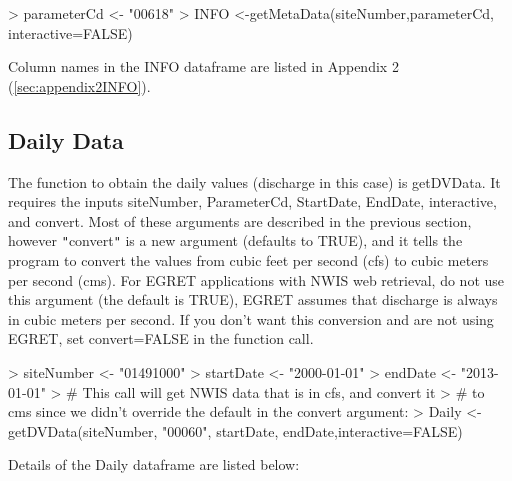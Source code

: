 \documentclass[a4paper,11pt]{article}
\begin{document}
\begin{Schunk}
\begin{Sinput}
> parameterCd <- "00618"
> INFO <-getMetaData(siteNumber,parameterCd, interactive=FALSE)
\end{Sinput}
\end{Schunk}

Column names in the INFO dataframe are listed in Appendix 2 (\ref{sec:appendix2INFO}).

\FloatBarrier
\subsection{Daily Data}
The function to obtain the daily values (discharge in this case) is getDVData.  It requires the inputs siteNumber, ParameterCd, StartDate, EndDate, interactive, and convert. Most of these arguments are described in the previous section, however \texttt{"}convert\texttt{"} is a new argument (defaults to TRUE), and it tells the program to convert the values from cubic feet per second (cfs) to cubic meters per second (cms). For EGRET applications with NWIS web retrieval, do not use this argument (the default is TRUE), EGRET assumes that discharge is always in cubic meters per second. If you don't want this conversion and are not using EGRET, set convert=FALSE in the function call. 

\begin{Schunk}
\begin{Sinput}
> siteNumber <- "01491000"
> startDate <- "2000-01-01"
> endDate <- "2013-01-01"
> # This call will get NWIS data that is in cfs, and convert it
> # to cms since we didn't override the default in the convert argument:
> Daily <- getDVData(siteNumber, "00060", startDate, endDate,interactive=FALSE)
\end{Sinput}
\end{Schunk}

Details of the Daily dataframe are listed below:
\end{document}
